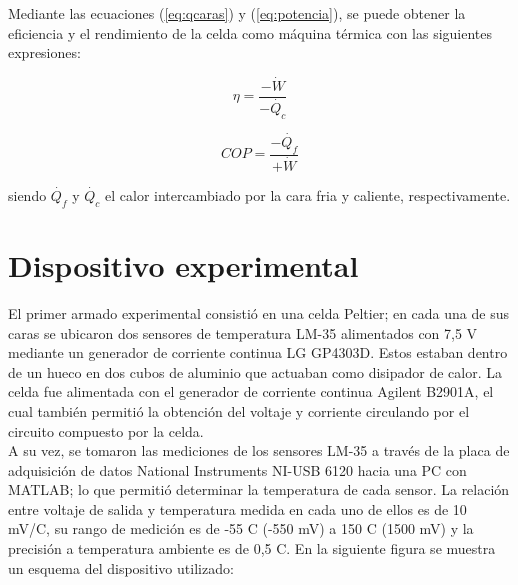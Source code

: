 \documentclass[twoside,twocolumn,a4paper]{article}
\begin{document}
Mediante las ecuaciones (\ref{eq:qcaras}) y (\ref{eq:potencia}), se puede obtener la eficiencia y el rendimiento de la celda como m\'aquina t\'ermica con las siguientes expresiones:


\begin{equation}
\label{eq:eficiencia}
\eta = \frac{-\dot{W}}{-\dot{Q_{c}}}
\end{equation}

\begin{equation}
\label{eq:rendimiento}
COP = \frac{-\dot{Q_{f}}}{+\dot{W}}
\end{equation}

siendo $\dot{Q_{f}}$ y $\dot{Q_{c}}$ el calor intercambiado por la cara fria y caliente, respectivamente.




\section{Dispositivo experimental}

El primer armado experimental consisti\'o en una celda Peltier; en cada una de sus caras se ubicaron dos sensores de temperatura LM-35 alimentados con 7,5 V mediante un generador de corriente continua LG GP4303D. Estos estaban dentro de un hueco en dos cubos de aluminio que actuaban como disipador de calor. La celda fue alimentada con el generador de corriente continua Agilent B2901A, el cual tambi\'en permiti\'o la obtenci\'on del voltaje y corriente circulando por el circuito compuesto por la celda.\\

A su vez, se tomaron las mediciones de los sensores LM-35 a trav\'es de la placa de adquisici\'on de datos National Instruments NI-USB 6120 hacia una PC con MATLAB; lo que permiti\'o determinar la temperatura de cada sensor. La relaci\'on entre voltaje de salida y temperatura medida en cada uno de ellos es de 10 mV/\degree C, su rango de medici\'on es de -55 \degree C (-550 mV) a 150 \degree C (1500 mV) y la precisi\'on a temperatura ambiente es de 0,5 \degree C. En la siguiente figura se muestra un esquema del dispositivo utilizado:
\end{document}
